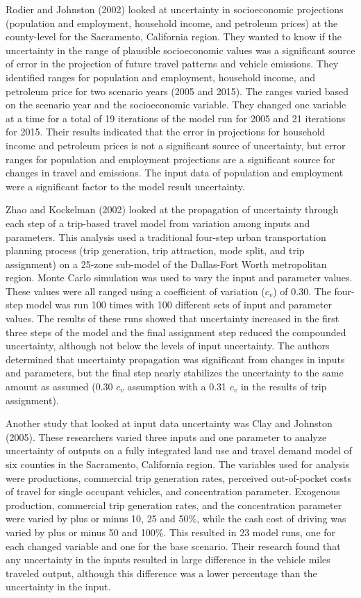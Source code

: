 \documentclass[
  futuretransp,
  submit,
  moreauthors,
]{Definitions/mdpi}
\begin{document}
Rodier and Johnston (2002) looked at uncertainty in socioeconomic
projections (population and employment, household income, and petroleum
prices) at the county-level for the Sacramento, California region. They
wanted to know if the uncertainty in the range of plausible
socioeconomic values was a significant source of error in the projection
of future travel patterns and vehicle emissions. They identified ranges
for population and employment, household income, and petroleum price for
two scenario years (2005 and 2015). The ranges varied based on the
scenario year and the socioeconomic variable. They changed one variable
at a time for a total of 19 iterations of the model run for 2005 and 21
iterations for 2015. Their results indicated that the error in
projections for household income and petroleum prices is not a
significant source of uncertainty, but error ranges for population and
employment projections are a significant source for changes in travel
and emissions. The input data of population and employment were a
significant factor to the model result uncertainty.

Zhao and Kockelman (2002) looked at the propagation of uncertainty
through each step of a trip-based travel model from variation among
inputs and parameters. This analysis used a traditional four-step urban
transportation planning process (trip generation, trip attraction, mode
split, and trip assignment) on a 25-zone sub-model of the Dallas-Fort
Worth metropolitan region. Monte Carlo simulation was used to vary the
input and parameter values. These values were all ranged using a
coefficient of variation (\(c_v\)) of 0.30. The four-step model was run
100 times with 100 different sets of input and parameter values. The
results of these runs showed that uncertainty increased in the first
three steps of the model and the final assignment step reduced the
compounded uncertainty, although not below the levels of input
uncertainty. The authors determined that uncertainty propagation was
significant from changes in inputs and parameters, but the final step
nearly stabilizes the uncertainty to the same amount as assumed (0.30
\(c_v\) assumption with a 0.31 \(c_v\) in the results of trip
assignment).

Another study that looked at input data uncertainty was Clay and
Johnston (2005). These researchers varied three inputs and one parameter
to analyze uncertainty of outputs on a fully integrated land use and
travel demand model of six counties in the Sacramento, California
region. The variables used for analysis were productions, commercial
trip generation rates, perceived out-of-pocket costs of travel for
single occupant vehicles, and concentration parameter. Exogenous
production, commercial trip generation rates, and the concentration
parameter were varied by plus or minus 10, 25 and 50\%, while the cash
cost of driving was varied by plus or minus 50 and 100\%. This resulted
in 23 model runs, one for each changed variable and one for the base
scenario. Their research found that any uncertainty in the inputs
resulted in large difference in the vehicle miles traveled output,
although this difference was a lower percentage than the uncertainty in
the input.
\end{document}
